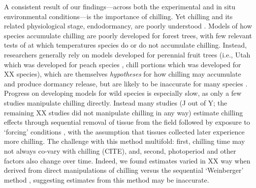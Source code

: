 \documentclass{article}
\begin{document}
\par A consistent result of our findings---across both the experimental and in situ environmental conditions---is the importance of chilling. Yet chilling and its related physiological stage, endodormancy, are poorly understood \citep{chuine2016}. Models of how species accumulate chilling are poorly developed for forest trees, with few relevant tests of at which temperatures species do or do not accumulate chilling. Instead, researchers generally rely on models developed for perennial fruit trees (i.e., Utah which was developed for peach species \citep{richardson1974}, chill portions which was developed for XX species), which are themselves \emph{hypotheses} for how chilling may accumulate and produce dormancy release, but are likely to be inaccurate for many species \citep{dennis2003}. Progress on developing models for wild species is especially slow, as only a few studies manipulate chilling directly. Instead many studies (J out of Y; the remaining XX studies did not manipulate chilling in any way) estimate chilling effects through sequential removal of tissue from the field followed by exposure to `forcing' conditions \citep{weinberger1950}, with the assumption that tissues collected later experience more chilling. The challenge with this method multifold: first, chilling time may not always co-vary with chilling (CITE), and, second, photoperiod and other factors also change over time. Indeed, we found estimates varied in XX way when derived from direct manipulations of chilling versus the sequential `Weinberger' method \citep{weinberger1950,polgar2013}, suggesting estimates from this method may be inaccurate.%
\end{document}
